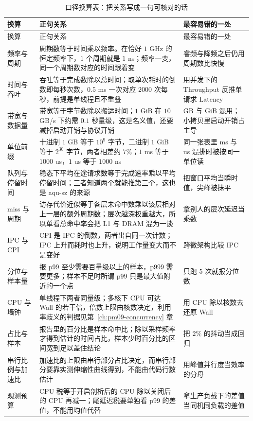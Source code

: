 \documentclass[12pt,a4paper,fontset=fandol]{ctexbook}
\newcommand{\Lang}[1]{\textsf{#1}}
\newcommand{\MWall}{\Lang{Wall}}
\newcommand{\MCpu}{\Lang{CPU}}
\newcommand{\MLat}{\Lang{Latency}}
\newcommand{\MThr}{\Lang{Throughput}}
\newcommand{\Mx}[1]{\textsf{#1}}
\begin{document}
{\footnotesize
\begin{longtable}{>{\raggedright\arraybackslash}p{} >{\raggedright\arraybackslash}p{} >{\raggedright\arraybackslash}p{}}
\caption{口径换算表：把关系写成一句可核对的话}\label{tab:pmapB-convert}\\
\toprule
换算 & 正句关系 & 最容易错的一处 \\
\midrule
\endfirsthead
\toprule
换算 & 正句关系 & 最容易错的一处 \\
\midrule
\endhead
\bottomrule
\endlastfoot
频率与周期 & 周期数等于时间乘以频率。在恰好 $1$ GHz 的恒定频率下，$1$ 个周期就是 $1$ ns；频率一变，同一个周期数对应的时间跟着变 & 睿频与降频之后仍用周期数比快慢 \\
时间与吞吐 & 吞吐等于完成数除以总时间；取单次耗时的倒数即每秒次数，$0.5$ ms 一次对应 $2000$ 次每秒，前提是单线程且不重叠 & 用并发下的 \MThr{} 反推单请求 \MLat{} \\
带宽与数据量 & 带宽等于字节数除以搬运时间；$1$ GiB 在 $10$ GB/s 下约需 $0.1$ 秒量级，这是名义值，还要减掉启动开销与协议开销 & GB 与 GiB 混用；小拷贝里启动开销占主导 \\
单位前缀 & 十进制 $1$ GB 等于 $10^{9}$ 字节，二进制 $1$ GiB 等于 $2^{30}$ 字节，两者相差约 $7\%$；$1$ ms 等于 $1000$ us，$1$ us 等于 $1000$ ns & 同一张表里 ms 与 us 混排时被按同一单位读 \\
队列与停留时间 & 稳态下平均在途请求数等于完成速率乘以平均停留时间；三者知道两个就能推第三个，这也是 \Mx{aqu-sz} 的来源 & 把窗口平均当瞬时值，尖峰被抹平 \\
miss 与周期 & 访存代价近似等于各层未命中数乘以该层相对上一层的额外周期数；层次越深权重越大，所以单看总命中率会把 L1 与 DRAM 混为一谈 & 拿别人的层次延迟当乘数 \\
IPC 与 CPI & \Mx{CPI} 是 \Mx{IPC} 的倒数，两者出自同一次计数；\Mx{IPC} 上升而耗时也上升，说明工作量变大而不是变好 & 跨微架构比较 \Mx{IPC} \\
分位与样本量 & 报 \Mx{p99} 至少需要百量级以上的样本，\Mx{p999} 需要更多；样本不足时所谓 \Mx{p99} 只是最大值附近的一个点 & 只跑 $5$ 次就报分位数 \\
CPU 与墙钟 & 单线程下两者同量级；多核下 \MCpu{} 可达 \MWall{} 的若干倍，倍数上限由核数决定，利用率歧义的判据见第~\ref{ch:pm09-concurrency} 章 & 用 \MCpu{} 除以核数去还原 \MWall{} \\
占比与样本 & 报告里的百分比是样本命中比；除以采样频率才得到估计的时间占比，样本少时百分比的区间宽到足以盖住结论 & 把 $2\%$ 的抖动当成回归 \\
串行比例与加速比 & 加速比的上限由串行部分占比决定，而串行部分要靠实测伸缩性曲线得到，不能由代码行数估计 & 用峰值并行度当效率的分母 \\
观测预算 & CPU 税等于开启剖析后的 \MCpu{} 除以关闭后的 \MCpu{} 再减一；尾延迟税要单独看 \Mx{p99} 的差值，不能用均值代替 & 拿生产负载下的差值当同机同负载的差值 \\
\end{longtable}
}
\end{document}
